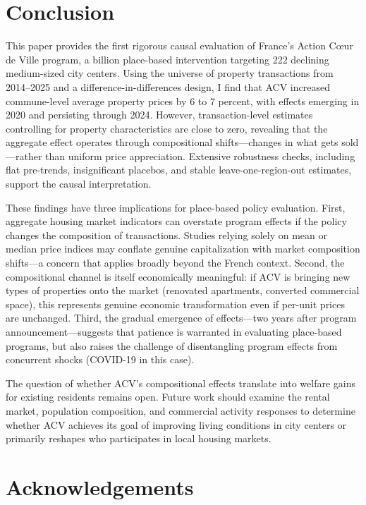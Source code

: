 \documentclass[12pt]{article}
\newcommand{\euro}{\texteuro}
\begin{document}
\section{Conclusion}

This paper provides the first rigorous causal evaluation of France's Action C\oe ur de Ville program, a \euro 5 billion place-based intervention targeting 222 declining medium-sized city centers. Using the universe of property transactions from 2014--2025 and a difference-in-differences design, I find that ACV increased commune-level average property prices by 6 to 7 percent, with effects emerging in 2020 and persisting through 2024. However, transaction-level estimates controlling for property characteristics are close to zero, revealing that the aggregate effect operates through compositional shifts---changes in what gets sold---rather than uniform price appreciation. Extensive robustness checks, including flat pre-trends, insignificant placebos, and stable leave-one-region-out estimates, support the causal interpretation.

These findings have three implications for place-based policy evaluation. First, aggregate housing market indicators can overstate program effects if the policy changes the composition of transactions. Studies relying solely on mean or median price indices may conflate genuine capitalization with market composition shifts---a concern that applies broadly beyond the French context. Second, the compositional channel is itself economically meaningful: if ACV is bringing new types of properties onto the market (renovated apartments, converted commercial space), this represents genuine economic transformation even if per-unit prices are unchanged. Third, the gradual emergence of effects---two years after program announcement---suggests that patience is warranted in evaluating place-based programs, but also raises the challenge of disentangling program effects from concurrent shocks (COVID-19 in this case).

The question of whether ACV's compositional effects translate into welfare gains for existing residents remains open. Future work should examine the rental market, population composition, and commercial activity responses to determine whether ACV achieves its goal of improving living conditions in city centers or primarily reshapes who participates in local housing markets.


\section*{Acknowledgements}
\end{document}
